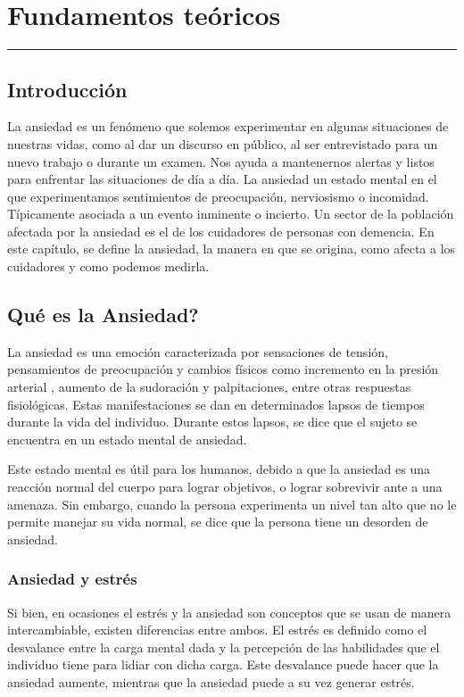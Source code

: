 \chapter{Fundamentos te\'oricos}\label{capit:cap2}
\vspace{-2.0325ex}%
\noindent
\rule{\textwidth}{0.5pt}
\vspace{-5.5ex}%
\newcommand{\pushline}{\Indp}%

\section{Introducci\'on}\label{secc:introduccion}
La ansiedad es un fen\'omeno que solemos experimentar en algunas situaciones de nuestras vidas, como  al dar un discurso en p\'ublico, al ser entrevistado para un nuevo trabajo o durante un examen. Nos ayuda a mantenernos alertas y listos para enfrentar las situaciones de d\'ia a d\'ia. La ansiedad un estado mental en el que experimentamos sentimientos de preocupaci\'on, nerviosismo o incomidad. T\'ipicamente asociada a un evento inminente o incierto. Un sector de la poblaci\'on afectada por la ansiedad es el de los cuidadores de personas con demencia. En este cap\'itulo, se define la ansiedad, la manera en que se origina, como afecta a los cuidadores y como podemos medirla.

\section{Qu\'e es la Ansiedad?}\label{secc:ansiedad}

La ansiedad es una emoci\'on caracterizada por sensaciones de tensi\'on, pensamientos de preocupaci\'on y cambios f\'isicos como incremento en la presi\'on arterial \citep{psychologyapa}, aumento de la sudoraci\'on y palpitaciones, entre otras respuestas fisiol\'ogicas. Estas manifestaciones se dan en determinados lapsos de tiempos durante la vida del individuo. Durante estos lapsos, se dice que el sujeto se encuentra en un estado mental de ansiedad.

Este estado mental es \'util para los humanos, debido a que la ansiedad es una reacci\'on normal del cuerpo para lograr objetivos, o lograr sobrevivir ante a una amenaza. Sin embargo, cuando la persona experimenta un nivel tan alto que no le permite manejar su vida normal, se dice que la persona tiene un desorden de ansiedad\citep{repetto2013}. 

\subsection{Ansiedad y estr\'es}\label{secc:anxietyandstress}
Si bien, en ocasiones el estr\'es y la ansiedad son conceptos que se usan de manera intercambiable, existen diferencias entre ambos. El estr\'es es definido como el desvalance entre la carga mental dada y la percepci\'on de las habilidades que el individuo tiene para lidiar con dicha carga. Este desvalance puede hacer que la ansiedad aumente, mientras que la ansiedad puede a su vez generar estr\'es. %


